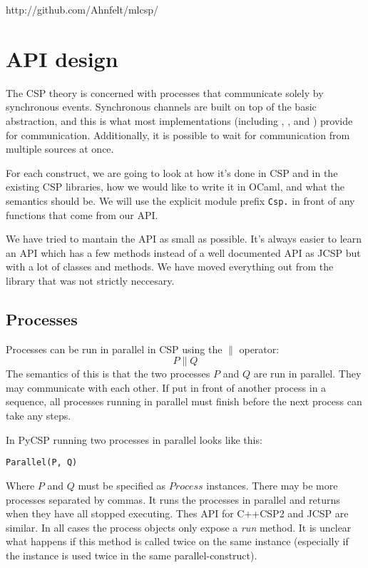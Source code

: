 \documentclass[a4paper,12pt]{article}
\begin{document}
\begin{center}
http://github.com/Ahnfelt/mlcsp/
\end{center}


\section{API design}
\label{apidesign}

The CSP theory is concerned with processes that communicate solely by synchronous 
events. Synchronous channels are built on top of the basic abstraction, and this is
what most implementations (including \cite{occam}, \cite{cppcsp2}, \cite{jcsp} and 
\cite{pycsp}) provide for communication. 
Additionally, it is possible to wait for communication from multiple sources at once.

For each construct, we are going to look at how it's done in CSP and in the 
existing CSP libraries, how we would like to write it in OCaml, and what the 
semantics should be. We will use the explicit module prefix \verb|Csp.| in front
of any functions that come from our API.

We have tried to mantain the API as small as possible. It's always easier to
learn an API which has a few methods instead of a well documented API as JCSP
but with a lot of classes and methods. We have moved everything out from the
library that was not strictly neccesary.

\subsection{Processes}
Processes can be run in parallel in CSP using the $\parallel$ operator:
\[P \parallel Q\]
The semantics of this is that the two processes $P$ and $Q$ are run in parallel. They
may communicate with each other. If put in front of another process in a sequence, all
processes running in parallel must finish before the next process can take any steps.

In PyCSP running two processes in parallel looks like this:
\begin{verbatim}
Parallel(P, Q)
\end{verbatim}
Where $P$ and $Q$ must be specified as $Process$ instances. There may be more processes
separated by commas. It runs the processes in parallel and returns when they have all 
stopped executing. Thes API for C++CSP2 and JCSP are similar. In all cases the
process objects only expose a \emph{run} method. It is unclear what happens if
this method is called twice on the same instance (especially if the instance is
used twice in the same parallel-construct).
\end{document}
